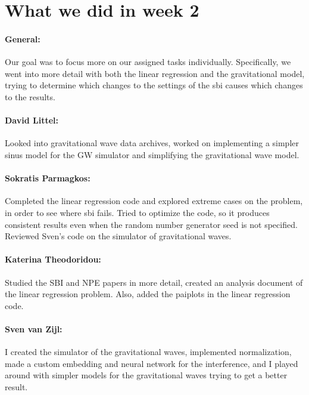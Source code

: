 \documentclass{article}
\begin{document}
\section*{What we did in week 2}

\paragraph{General:}
Our goal was to focus more on our assigned tasks individually. Specifically, we went into more detail with both the linear regression and the gravitational model, trying to determine which changes to the settings of the sbi causes which changes to the results.

\paragraph{David Littel:}
Looked into gravitational wave data archives, worked on implementing a simpler sinus model for the GW simulator and simplifying the gravitational wave model.

\paragraph{Sokratis Parmagkos:}
Completed the linear regression code and explored extreme cases on the problem, in order to see where sbi fails.
Tried to optimize the code, so it produces consistent results even when the random number generator seed is not specified. Reviewed Sven's code on the simulator of gravitational waves.

\paragraph{Katerina Theodoridou:}
Studied the SBI and NPE papers in more detail, created an analysis document of the linear regression problem. Also, added the paiplots in the linear regression code. 

\paragraph{Sven van Zijl:}
I created the simulator of the gravitational waves, implemented normalization, made a custom embedding and neural network for the interference, and I played around with simpler models for the gravitational waves trying to get a better result.
\end{document}
